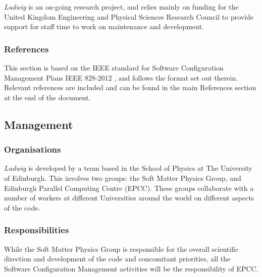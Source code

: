 \documentclass[11pt,twoside]{article}
\begin{document}
\textit{Ludwig} is an on-going research project, and relies mainly
on funding for the United Kingdom Engineering and Physical Sciences Research
Council to provide support for staff time to work on maintenance and
development.


\subsubsection{References}

This section is based on the IEEE standard for Software Configuration
Management Plans IEEE 828-2012 \cite{ieee-828-2012}, and follows the format
set out therein.
Relevant references are included and can be found in the main References
section at the end of the document.

\subsection{Management}

\subsubsection{Organisations}

\textit{Ludwig} is developed by a team based in the School of Physics at
The University of Edinburgh. This involves two groups: the Soft Matter
Physics Group, and Edinburgh Parallel Computing Centre (EPCC). These
groups collaborate with a number of workers at different Universities
around the world on different aspects of the code.

\subsubsection{Responsibilities}

While the Soft Matter Physics Group is responsible for the overall
scientific direction and development of the code and concomitant
priorities, all the Software Configuration Management activities will
be the responsibility of EPCC.

\end{document}
